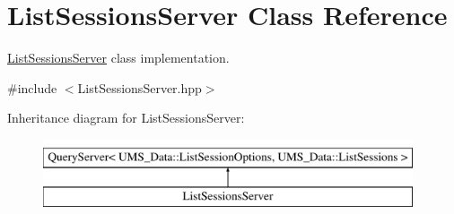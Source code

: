 \hypertarget{classListSessionsServer}{
\section{ListSessionsServer Class Reference}
\label{classListSessionsServer}
}


\hyperlink{classListSessionsServer}{ListSessionsServer} class implementation.  




{\ttfamily \#include $<$ListSessionsServer.hpp$>$}

Inheritance diagram for ListSessionsServer:\begin{figure}[H]
\begin{center}
\leavevmode
\includegraphics[height=2.000000cm]{classListSessionsServer}
\end{center}
\end{figure}
